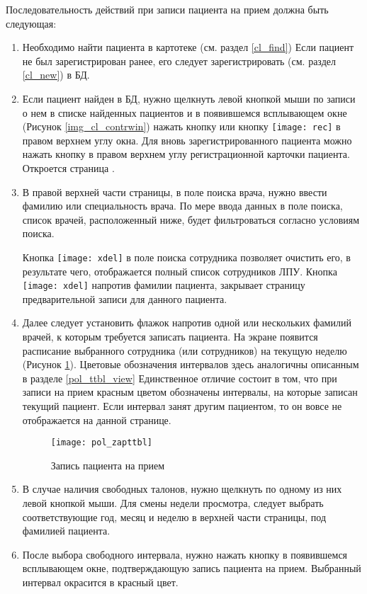 Последовательность действий при записи пациента на прием должна быть следующая:
\begin{enumerate}
 \item \label{n4} Необходимо найти пациента в картотеке (см. раздел \ref{cl_find}) Если пациент не был зарегистрирован ранее, его следует зарегистрировать (см. раздел \ref{cl_new}) в  БД.
 \item Если пациент найден в БД, нужно щелкнуть левой кнопкой мыши по записи о нем в списке найденных пациентов и в появившемся всплывающем окне (Рисунок \ref{img_cl_contrwin}) нажать кнопку  или кнопку \texttt{[image: rec]} в правом верхнем углу окна. Для вновь зарегистрированного пациента можно нажать кнопку  в правом верхнем углу регистрационной карточки пациента. Откроется страница .  
 \item В правой верхней части страницы, в поле поиска врача, нужно ввести фамилию или специальность врача. По мере ввода данных в поле поиска, список врачей, расположенный ниже, будет фильтроваться согласно условиям поиска.
 
 \begin{prim}
   Кнопка  \texttt{[image: xdel]} в поле поиска сотрудника позволяет очистить его, в результате чего, отображается полный список сотрудников ЛПУ. Кнопка  \texttt{[image: xdel]} напротив фамилии пациента, закрывает страницу предварительной записи для данного пациента.
  \end{prim}
  
 \item \label{n5} Далее следует установить флажок напротив одной или нескольких фамилий врачей, к которым требуется записать пациента. На экране появится расписание выбранного сотрудника (или сотрудников) на текущую неделю (Рисунок \ref{img_pol_zapttbl}). Цветовые обозначения интервалов здесь аналогичны описанным в разделе \ref{pol_ttbl_view} Единственное отличие состоит в том, что при записи на прием красным цветом обозначены интервалы, на которые записан текущий пациент. Если интервал занят другим пациентом, то он вовсе не отображается на данной странице.
 
 \begin{figure}[ht]\centering
  \texttt{[image: pol\_zapttbl]}
  \caption{Запись пациента на прием}
  \label{img_pol_zapttbl}
 \end{figure}
 
 \item В случае наличия свободных талонов, нужно щелкнуть по одному из них левой кнопкой мыши. Для смены недели просмотра, следует выбрать соответствующие год, месяц и неделю в верхней части страницы, под фамилией пациента.
 \item После выбора свободного интервала, нужно нажать кнопку  в появившемся всплывающем окне, подтверждающую запись пациента на прием. Выбранный интервал окрасится в красный цвет.
\end{enumerate}

